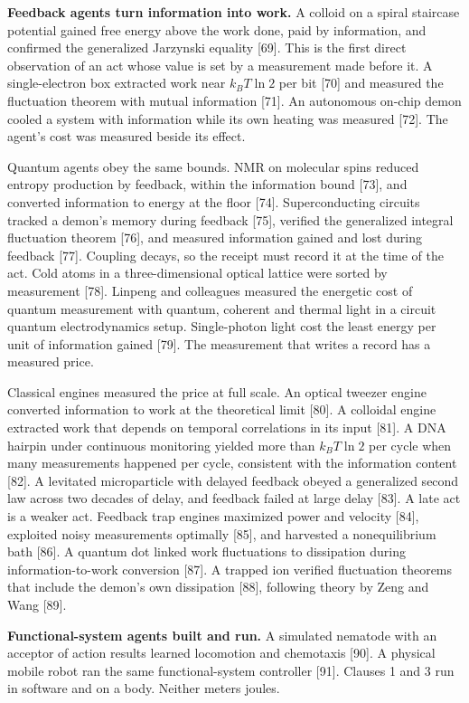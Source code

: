 \documentclass[
  10pt,
]{article}
\newcounter{none} %
\begin{document}
\textbf{Feedback agents turn information into work.} A colloid on a
spiral staircase potential gained free energy above the work done, paid
by information, and confirmed the generalized Jarzynski equality
{[}69{]}. This is the first direct observation of an act whose value is
set by a measurement made before it. A single-electron box extracted
work near \(k_B T \ln 2\) per bit {[}70{]} and measured the fluctuation
theorem with mutual information {[}71{]}. An autonomous on-chip demon
cooled a system with information while its own heating was measured
{[}72{]}. The agent's cost was measured beside its effect.

Quantum agents obey the same bounds. NMR on molecular spins reduced
entropy production by feedback, within the information bound {[}73{]},
and converted information to energy at the floor {[}74{]}.
Superconducting circuits tracked a demon's memory during feedback
{[}75{]}, verified the generalized integral fluctuation theorem
{[}76{]}, and measured information gained and lost during feedback
{[}77{]}. Coupling decays, so the receipt must record it at the time of
the act. Cold atoms in a three-dimensional optical lattice were sorted
by measurement {[}78{]}. Linpeng and colleagues measured the energetic
cost of quantum measurement with quantum, coherent and thermal light in
a circuit quantum electrodynamics setup. Single-photon light cost the
least energy per unit of information gained {[}79{]}. The measurement
that writes a record has a measured price.

Classical engines measured the price at full scale. An optical tweezer
engine converted information to work at the theoretical limit {[}80{]}.
A colloidal engine extracted work that depends on temporal correlations
in its input {[}81{]}. A DNA hairpin under continuous monitoring yielded
more than \(k_B T \ln 2\) per cycle when many measurements happened per
cycle, consistent with the information content {[}82{]}. A levitated
microparticle with delayed feedback obeyed a generalized second law
across two decades of delay, and feedback failed at large delay
{[}83{]}. A late act is a weaker act. Feedback trap engines maximized
power and velocity {[}84{]}, exploited noisy measurements optimally
{[}85{]}, and harvested a nonequilibrium bath {[}86{]}. A quantum dot
linked work fluctuations to dissipation during information-to-work
conversion {[}87{]}. A trapped ion verified fluctuation theorems that
include the demon's own dissipation {[}88{]}, following theory by Zeng
and Wang {[}89{]}.

\textbf{Functional-system agents built and run.} A simulated nematode
with an acceptor of action results learned locomotion and chemotaxis
{[}90{]}. A physical mobile robot ran the same functional-system
controller {[}91{]}. Clauses 1 and 3 run in software and on a body.
Neither meters joules.
\end{document}
